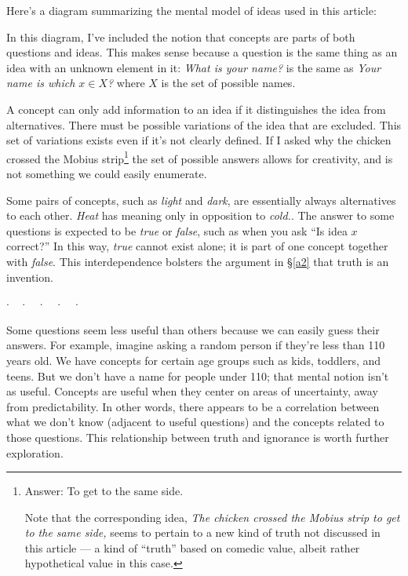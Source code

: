 \documentclass[11pt, oneside]{article}
\theoremstyle{argtstyle}
\newcommand{\dotq}{\cdot\quad}
\newcommand{\scenebreak}{
    \medskip\centerline{$\dotq\dotq\dotq\dotq\cdot$}\medskip
}
\begin{document}
Here's a diagram summarizing the mental model of ideas used in this
article:

\begin{center}
%
\end{center}

In this diagram, I've included the notion that concepts are parts of both
questions and ideas.
This makes sense because a question is the same thing as an idea
with an unknown element in it: {\em What is your name?} is the same as
{\em Your name is which $x\in X$?} where $X$ is the set of possible names.

A concept can only add information to an idea if it distinguishes the idea
from alternatives.
There must be possible variations of the idea that are excluded.
This set of variations exists even if it's not clearly defined.
If I asked why the chicken crossed the Mobius strip\footnote{Answer: To
get to the same side.\par Note that the corresponding idea, {\em The chicken
crossed the Mobius strip to get to the same side,} seems to pertain to a new
kind of truth not discussed in this article ---
a kind of ``truth'' based on comedic
value, albeit rather hypothetical value in this case.}
the set of possible answers allows for creativity, and is not something we could
easily enumerate.

Some pairs of concepts, such as {\em light} and {\em dark}, are essentially
always alternatives to each other.
{\em Heat} has meaning only in opposition to {\em cold.}.
The answer to some questions is expected to be {\em true} or {\em false},
such as when you ask ``Is idea $x$ correct?''
In this way, {\em true} cannot exist alone; it is part of one concept
together with {\em false}.
This interdependence bolsters the argument in \S\ref{a2} that truth is
an invention.

\scenebreak

Some questions seem less useful than others because we can easily guess their
answers.
For example,
imagine asking a random person if they're
less than 110 years old.
We have concepts for certain age groups such as kids,
toddlers, and teens.
But we don't have a name for people under 110;
that mental notion isn't as useful.
Concepts are useful when they center on
areas of uncertainty, away from predictability.
In other words, there appears to be a correlation between
what we don't know (adjacent to useful questions) and the concepts
related to those questions.
This relationship between truth and ignorance is worth further exploration.
\end{document}
